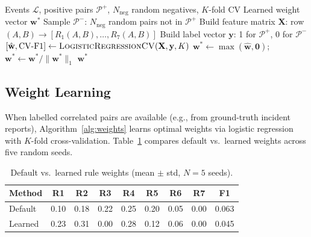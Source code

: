 \begin{algorithm}[t]
\caption{Weight Learning (optional, requires labelled pairs)}
\label{alg:weights}
\begin{algorithmic}[1]
\Require Events $\mathcal{L}$, positive pairs $\mathcal{P}^+$,
         $N_{\text{neg}}$ random negatives, $K$-fold CV
\Ensure Learned weight vector $\mathbf{w}^*$
\State Sample $\mathcal{P}^-$: $N_{\text{neg}}$ random pairs not in $\mathcal{P}^+$
\State Build feature matrix $\mathbf{X}$: row $(A,B) \to [R_1(A,B),\ldots,R_7(A,B)]$
\State Build label vector $\mathbf{y}$: 1 for $\mathcal{P}^+$, 0 for $\mathcal{P}^-$
\State $[\hat{\mathbf{w}}, \text{CV-F1}] \gets \textsc{LogisticRegressionCV}(\mathbf{X}, \mathbf{y}, K)$
\State $\mathbf{w}^* \gets \max(\hat{\mathbf{w}}, \mathbf{0})$;
       $\mathbf{w}^* \gets \mathbf{w}^* / \|\mathbf{w}^*\|_1$
\State \Return $\mathbf{w}^*$
\end{algorithmic}
\end{algorithm}

\subsection{Weight Learning}
\label{sec:weight_learning}

When labelled correlated pairs are available (e.g., from ground-truth
incident reports), Algorithm~\ref{alg:weights} learns optimal weights via
logistic regression with $K$-fold cross-validation. Table~\ref{tab:learned_weights}
compares default vs.\ learned weights across five random seeds.

\begin{table}[t]
\centering
\caption{Default vs.\ learned rule weights (mean $\pm$ std, $N=5$ seeds).}
\label{tab:learned_weights}
\begin{tabular}{lcccccccc}
\toprule
\textbf{Method} & R1 & R2 & R3 & R4 & R5 & R6 & R7 & \textbf{F1} \\
\midrule
Default  & 0.10 & 0.18 & 0.22 & 0.25 & 0.20 & 0.05 & 0.00 & 0.063 \\
Learned  & 0.23 & 0.31 & 0.00 & 0.28 & 0.12 & 0.06 & 0.00 & 0.045 \\
\bottomrule
\end{tabular}
\end{table}


